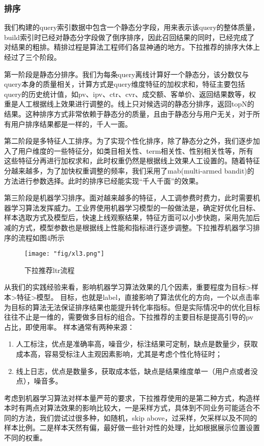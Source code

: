 \subsubsection{排序}
我们构建的query索引数据中包含一个静态分字段，用来表示该query的整体质量，build索引时已经对静态分字段做了倒序排序，因此召回结果的同时，已经完成了对结果的粗排。精排过程是算法工程师们各显神通的地方。下拉推荐的排序大体上经过了三个阶段。
\par 第一阶段是静态分排序。我们为每条query离线计算好一个静态分，该分数仅与query本身的质量相关，计算方式是query维度特征的加权求和，特征主要包括query的历史统计值，如pv、ipv、ctr、cvr、成交额、客单价、返回结果数等，权重是人工根据线上效果进行调整的。线上只对候选词的静态分排序，返回topN的结果。这种排序方式非常依赖于静态分的质量，且由于静态分与用户无关，对于所有用户排序结果都是一样的，千人一面。
\par 第二阶段是多特征人工排序。为了实现个性化排序，除了静态分之外，我们逐步加入了用户维度的一些特征分，如类目相关性、term相关性、性别相关性等，所有这些特征分再进行加权求和，此时权重仍然是根据线上效果人工设置的。随着特征分越来越多，为了加快权重调整的频率，我们采用了mab(multi-armed bandit)的方法进行参数选择。此时的排序已经能实现“千人千面”的效果。
\par 第三阶段是机器学习排序。面对越来越多的特征，人工调参费时费力，此时需要机器学习算法发挥威力。工业界使用机器学习模型的一般做法是，确定好优化目标、样本选取方式及模型后，快速上线观察结果，特征方面可以小步快跑，采用先加后减的方式，模型参数也是根据线上性能和指标进行逐步调整。下拉推荐机器学习排序的流程如图4所示
\begin{figure}[!h]
	\centering
	\texttt{[image: "fig/xl3.png"]}
	\caption{下拉推荐ltr流程}
	\label{fig:xl3}
\end{figure}
从我们的实践经验来看，影响机器学习算法效果的几个因素，重要程度为目标>样本>特征>模型。
目标，也就是label，直接影响了算法优化的方向，一个以点击率为目标的算法无法保证排序结果也能提升转化率指标。但是实际情况中的优化目标往往不止是一维的，需要做多目标的组合。下拉推荐的主要目标是提高引导的pv占比，即使用率。
样本通常有两种来源：
\begin{enumerate}
\item 人工标注，优点是准确率高，噪音少，标注结果可定制，缺点是数量少，获取成本高，容易受标注人主观因素影响，尤其是考虑个性化特征时；
\item 线上日志，优点是数量多，获取成本低，缺点是结果维度单一（用户点或者没点），噪音多。
\end{enumerate}
考虑到机器学习算法对样本量严苛的要求，下拉推荐使用的是第二种方式，构造样本时有两点对算法效果的影响比较大，一是采样方式，具体到不同业务可能适合不同的方法，我们尝试过很多种，如随机，skip above，过采样，欠采样以及不同的样本比例。二是样本天然有偏，最好做一些针对性的处理，比如根据展示位置设置不同的权重。
